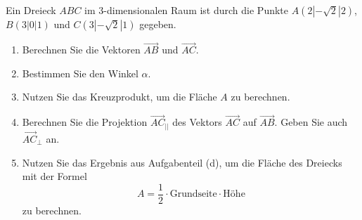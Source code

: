 \begin{ExerciseBlock}
Ein Dreieck $ABC$ im 3-dimensionalen Raum ist durch die Punkte $A(2|-\sqrt{2}|2)$, $B(3|0|1)$ und $C(3|-\sqrt{2}|1)$ gegeben.

\begin{center}
\end{center}

\begin{enumerate}[label=\alph*)]
	
	\item Berechnen Sie die Vektoren $\vec{AB}$ und $\vec{AC}$. 	
	
	\item Bestimmen Sie den Winkel $\alpha$.
	
	\item Nutzen Sie das Kreuzprodukt, um die Fläche $A$ zu berechnen. 
	
	\item Berechnen Sie die Projektion $\vec{AC}_{||}$ des Vektors $\vec{AC}$ auf  $\vec{AB}$. Geben Sie auch $\vec{AC}_{\perp}$ an.
	
	\item Nutzen Sie das Ergebnis aus Aufgabenteil (d), um die Fläche des Dreiecks mit der Formel \[ A = \frac{1}{2} \cdot \text{Grundseite} \cdot \text{Höhe} \] zu berechnen. 
\end{enumerate}

\end{ExerciseBlock}
